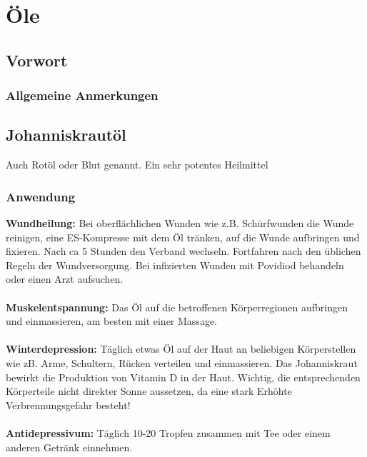 \chapter{Öle}

\section{Vorwort}

\lipsum[1-5]
\newpage





\subsection{Allgemeine Anmerkungen}





\section{Johanniskrautöl}

Auch Rotöl oder Blut genannt. Ein sehr potentes Heilmittel

\subsection{Anwendung}

\textbf{Wundheilung:} Bei oberflächlichen Wunden wie z.B. Schürfwunden die Wunde reinigen, eine ES-Kompresse mit dem Öl tränken, auf die Wunde aufbringen und fixieren. Nach ca 5 Stunden den Verband wechseln. Fortfahren nach den üblichen Regeln der Wundversorgung. Bei infizierten Wunden mit Povidiod behandeln oder einen Arzt aufsuchen.\\ \\
\textbf{Muskelentspannung:} Das Öl auf die betroffenen Körperregionen aufbringen und einmassieren, am besten mit einer Massage. \\ \\
\textbf{Winterdepression:} Täglich etwas Öl auf der Haut an beliebigen Körperstellen wie zB. Arme, Schultern, Rücken verteilen und einmassieren. Das Johanniskraut bewirkt die Produktion von Vitamin D in der Haut. Wichtig, die entsprechenden Körperteile nicht direkter Sonne aussetzen, da eine stark Erhöhte Verbrennungsgefahr besteht! \\ \\
\textbf{Antidepressivum:} Täglich 10-20 Tropfen zusammen mit Tee oder einem anderen Getränk einnehmen. 

